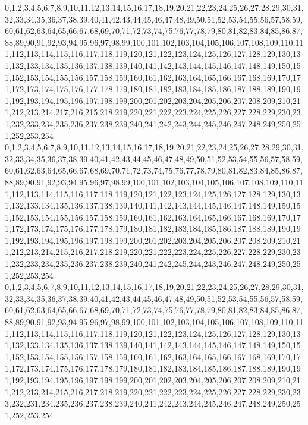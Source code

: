 \documentclass[12pt]{article}
\begin{document}
{0,1,2,3,4,5,6,7,8,9,10,11,12,13,14,15,16,17,18,19,20,21,22,23,24,25,26,27,28,29,30,31,32,33,34,35,36,37,38,39,40,41,42,43,44,45,46,47,48,49,50,51,52,53,54,55,56,57,58,59,60,61,62,63,64,65,66,67,68,69,70,71,72,73,74,75,76,77,78,79,80,81,82,83,84,85,86,87,88,89,90,91,92,93,94,95,96,97,98,99,100,101,102,103,104,105,106,107,108,109,110,111,112,113,114,115,116,117,118,119,120,121,122,123,124,125,126,127,128,129,130,131,132,133,134,135,136,137,138,139,140,141,142,143,144,145,146,147,148,149,150,151,152,153,154,155,156,157,158,159,160,161,162,163,164,165,166,167,168,169,170,171,172,173,174,175,176,177,178,179,180,181,182,183,184,185,186,187,188,189,190,191,192,193,194,195,196,197,198,199,200,201,202,203,204,205,206,207,208,209,210,211,212,213,214,217,216,215,218,219,220,221,222,223,224,225,226,227,228,229,230,231,232,233,234,235,236,237,238,239,240,241,242,243,244,245,246,247,248,249,250,251,252,253,254\\
0,1,2,3,4,5,6,7,8,9,10,11,12,13,14,15,16,17,18,19,20,21,22,23,24,25,26,27,28,29,30,31,32,33,34,35,36,37,38,39,40,41,42,43,44,45,46,47,48,49,50,51,52,53,54,55,56,57,58,59,60,61,62,63,64,65,66,67,68,69,70,71,72,73,74,75,76,77,78,79,80,81,82,83,84,85,86,87,88,89,90,91,92,93,94,95,96,97,98,99,100,101,102,103,104,105,106,107,108,109,110,111,112,113,114,115,116,117,118,119,120,121,122,123,124,125,126,127,128,129,130,131,132,133,134,135,136,137,138,139,140,141,142,143,144,145,146,147,148,149,150,151,152,153,154,155,156,157,158,159,160,161,162,163,164,165,166,167,168,169,170,171,172,173,174,175,176,177,178,179,180,181,182,183,184,185,186,187,188,189,190,191,192,193,194,195,196,197,198,199,200,201,202,203,204,205,206,207,208,209,210,211,212,213,214,215,216,217,218,219,220,221,222,223,224,225,226,227,228,229,230,231,232,233,234,235,236,237,238,239,240,241,242,245,244,243,246,247,248,249,250,251,252,253,254\\
0,1,2,3,4,5,6,7,8,9,10,11,12,13,14,15,16,17,18,19,20,21,22,23,24,25,26,27,28,29,30,31,32,33,34,35,36,37,38,39,40,41,42,43,44,45,46,47,48,49,50,51,52,53,54,55,56,57,58,59,60,61,62,63,64,65,66,67,68,69,70,71,72,73,74,75,76,77,78,79,80,81,82,83,84,85,86,87,88,89,90,91,92,93,94,95,96,97,98,99,100,101,102,103,104,105,106,107,108,109,110,111,112,113,114,115,116,117,118,119,120,121,122,123,124,125,126,127,128,129,130,131,132,133,134,135,136,137,138,139,140,141,142,143,144,145,146,147,148,149,150,151,152,153,154,155,156,157,158,159,160,161,162,163,164,165,166,167,168,169,170,171,172,173,174,175,176,177,178,179,180,181,182,183,184,185,186,187,188,189,190,191,192,193,194,195,196,197,198,199,200,201,202,203,204,205,206,207,208,209,210,211,212,213,214,215,216,217,218,219,220,221,222,223,224,225,226,227,228,229,230,233,232,231,234,235,236,237,238,239,240,241,242,243,244,245,246,247,248,249,250,251,252,253,254\\
}
\end{document}

